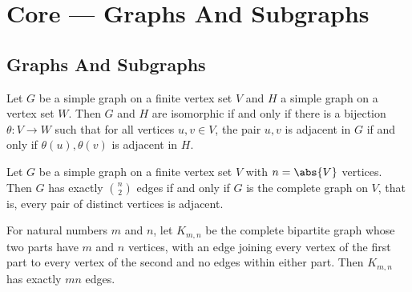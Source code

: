 \section{Core --- Graphs And Subgraphs}
\subsection{Graphs And Subgraphs}


\begin{theorem}
\label{SimpleGraph.nonempty_iso_iff}
\leanok
Let $G$ be a simple graph on a finite vertex set $V$ and $H$ a simple graph on a vertex
set $W$. Then $G$ and $H$ are isomorphic if and only if there is a bijection $\theta
\colon V \to W$ such that for all vertices $u, v \in V$, the pair $u, v$ is adjacent in
$G$ if and only if $\theta(u), \theta(v)$ is adjacent in $H$.
\end{theorem}

\begin{theorem}
\label{SimpleGraph.edgeCard_eq_choose_two_iff_top}
\leanok
Let $G$ be a simple graph on a finite vertex set $V$ with $n = \abs{V}$ vertices. Then
$G$ has exactly $\binom{n}{2}$ edges if and only if $G$ is the complete graph on $V$,
that is, every pair of distinct vertices is adjacent.
\end{theorem}

\begin{theorem}
\label{SimpleGraph.completeBipartite_edgeCard}
\leanok
For natural numbers $m$ and $n$, let $K_{m,n}$ be the complete bipartite graph whose two
parts have $m$ and $n$ vertices, with an edge joining every vertex of the first part to
every vertex of the second and no edges within either part. Then $K_{m,n}$ has exactly
$mn$ edges.
\end{theorem}

